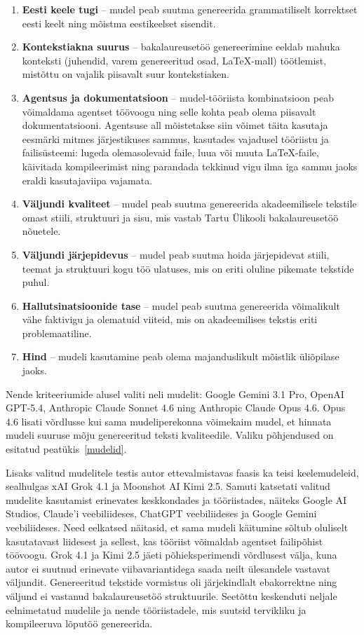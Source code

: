 \begin{enumerate}
    \item \textbf{Eesti keele tugi} -- mudel peab suutma genereerida grammatiliselt korrektset eesti keelt ning mõistma eestikeelset sisendit.
    \item \textbf{Kontekstiakna suurus} -- bakalaureusetöö genereerimine eeldab mahuka konteksti (juhendid, varem genereeritud osad, \LaTeX{}-mall) töötlemist, mistõttu on vajalik piisavalt suur kontekstiaken.
    \item \textbf{Agentsus ja dokumentatsioon} -- mudel-tööriista kombinatsioon peab võimaldama agentset töövoogu ning selle kohta peab olema piisavalt dokumentatsiooni. Agentsuse all mõistetakse siin võimet täita kasutaja eesmärki mitmes järjestikuses sammus, kasutades vajadusel tööriistu ja failisüsteemi: lugeda olemasolevaid faile, luua või muuta \LaTeX{}-faile, käivitada kompileerimist ning parandada tekkinud vigu ilma iga sammu jaoks eraldi kasutajaviipa vajamata.
    \item \textbf{Väljundi kvaliteet} -- mudel peab suutma genereerida akadeemilisele tekstile omast stiili, struktuuri ja sisu, mis vastab Tartu Ülikooli bakalaureusetöö nõuetele.
    \item \textbf{Väljundi järjepidevus} -- mudel peab suutma hoida järjepidevat stiili, teemat ja struktuuri kogu töö ulatuses, mis on eriti oluline pikemate tekstide puhul.
    \item \textbf{Hallutsinatsioonide tase} -- mudel peab suutma genereerida võimalikult vähe faktivigu ja olematuid viiteid, mis on akadeemilises tekstis eriti problemaatiline.
    \item \textbf{Hind} -- mudeli kasutamine peab olema majanduslikult mõistlik üliõpilase jaoks.
\end{enumerate}

Nende kriteeriumide alusel valiti neli mudelit: Google Gemini 3.1 Pro, OpenAI GPT-5.4, Anthropic Claude Sonnet 4.6 ning Anthropic Claude Opus 4.6. Opus 4.6 lisati võrdlusse kui sama mudeliperekonna võimekaim mudel, et hinnata mudeli suuruse mõju genereeritud teksti kvaliteedile. Valiku põhjendused on esitatud peatükis~\ref{mudelid}.

Lisaks valitud mudelitele testis autor ettevalmistavas faasis ka teisi keelemudeleid, sealhulgas xAI Grok 4.1 ja Moonshot AI Kimi 2.5. Samuti katsetati valitud mudelite kasutamist erinevates keskkondades ja tööriistades, näiteks Google AI Studios, Claude'i veebiliideses, ChatGPT veebiliideses ja Google Gemini veebiliideses. Need eelkatsed näitasid, et sama mudeli käitumine sõltub oluliselt kasutatavast liidesest ja sellest, kas tööriist võimaldab agentset failipõhist töövoogu. Grok 4.1 ja Kimi 2.5 jäeti põhieksperimendi võrdlusest välja, kuna autor ei suutnud erinevate viibavariantidega saada neilt ülesandele vastavat väljundit. Genereeritud tekstide vormistus oli järjekindlalt ebakorrektne ning väljund ei vastanud bakalaureusetöö struktuurile. Seetõttu keskenduti neljale eelnimetatud mudelile ja nende tööriistadele, mis suutsid tervikliku ja kompileeruva lõputöö genereerida.

